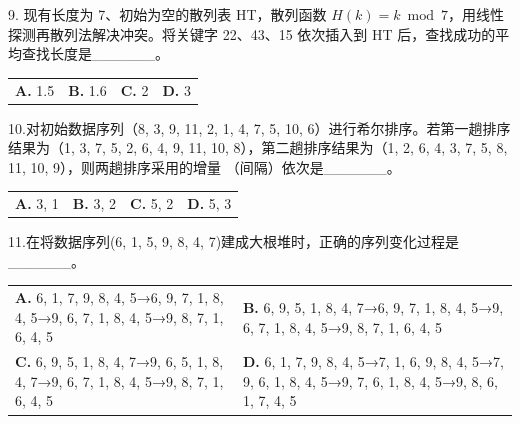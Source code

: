\documentclass[UTF8,11pt]{ctexart}
\begin{document}
9. 现有长度为 7、初始为空的散列表 HT，散列函数 \(\displaystyle H(k)=k\bmod7\)，用线性探测再散列法解决冲突。将关键字 22、43、15 依次插入到 HT 后，查找成功的平均查找长度是\_\_\_\_\_\_。


\begin{center}\begin{tabular}{>{\raggedright\arraybackslash}p{\dimexpr(\linewidth-8\tabcolsep)/4\relax}>{\raggedright\arraybackslash}p{\dimexpr(\linewidth-8\tabcolsep)/4\relax}>{\raggedright\arraybackslash}p{\dimexpr(\linewidth-8\tabcolsep)/4\relax}>{\raggedright\arraybackslash}p{\dimexpr(\linewidth-8\tabcolsep)/4\relax}}
\textbf{A.} 1.\allowbreak{}5 & \textbf{B.} 1.\allowbreak{}6 & \textbf{C.} 2 & \textbf{D.} 3\\[.35em]\end{tabular}\end{center}

10.对初始数据序列（8, 3, 9, 11, 2, 1, 4, 7, 5, 10, 6）进行希尔排序。若第一趟排序结果为（1, 3, 7, 5, 2, 6, 4, 9, 11, 10, 8），第二趟排序结果为（1, 2, 6, 4, 3, 7, 5, 8, 11, 10, 9），则两趟排序采用的增量 （间隔）依次是\_\_\_\_\_\_。


\begin{center}\begin{tabular}{>{\raggedright\arraybackslash}p{\dimexpr(\linewidth-8\tabcolsep)/4\relax}>{\raggedright\arraybackslash}p{\dimexpr(\linewidth-8\tabcolsep)/4\relax}>{\raggedright\arraybackslash}p{\dimexpr(\linewidth-8\tabcolsep)/4\relax}>{\raggedright\arraybackslash}p{\dimexpr(\linewidth-8\tabcolsep)/4\relax}}
\textbf{A.} 3, 1 & \textbf{B.} 3, 2 & \textbf{C.} 5, 2 & \textbf{D.} 5, 3\\[.35em]\end{tabular}\end{center}

11.在将数据序列(6, 1, 5, 9, 8, 4, 7)建成大根堆时，正确的序列变化过程是\_\_\_\_\_\_。


\begin{center}\begin{tabular}{>{\raggedright\arraybackslash}p{\dimexpr(\linewidth-4\tabcolsep)/2\relax}>{\raggedright\arraybackslash}p{\dimexpr(\linewidth-4\tabcolsep)/2\relax}}
\textbf{A.} 6, 1, 7, 9, 8, 4, 5→6, 9, 7, 1, 8, 4, 5→9, 6, 7, 1, 8, 4, 5→9, 8, 7, 1, 6, 4, 5 & \textbf{B.} 6, 9, 5, 1, 8, 4, 7→6, 9, 7, 1, 8, 4, 5→9, 6, 7, 1, 8, 4, 5→9, 8, 7, 1, 6, 4, 5\\[.35em]
\textbf{C.} 6, 9, 5, 1, 8, 4, 7→9, 6, 5, 1, 8, 4, 7→9, 6, 7, 1, 8, 4, 5→9, 8, 7, 1, 6, 4, 5 & \textbf{D.} 6, 1, 7, 9, 8, 4, 5→7, 1, 6, 9, 8, 4, 5→7, 9, 6, 1, 8, 4, 5→9, 7, 6, 1, 8, 4, 5→9, 8, 6, 1, 7, 4, 5\\[.35em]\end{tabular}\end{center}
\end{document}
